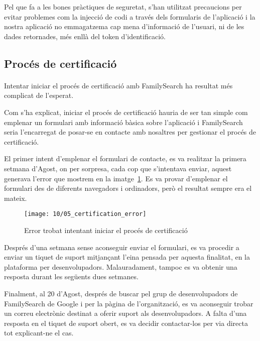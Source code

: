    Pel que fa a les bones pràctiques de seguretat, s'han utilitzat precaucions per evitar problemes com la injecció de codi a través dels formularis de l'aplicació i la nostra aplicació no emmagatzema cap mena d'informació de l'usuari, ni de les dades retornades, més enllà del token d'identificació.


    \subsection{Procés de certificació}

    \paragraph{}
    Intentar iniciar el procés de certificació amb FamilySearch ha resultat més complicat de l’esperat.

    Com s’ha explicat, iniciar el procés de certificació hauria de ser tan simple com emplenar un formulari amb informació bàsica sobre l’aplicació i FamilySearch seria l’encarregat de posar-se en contacte amb nosaltres per gestionar el procés de certificació.

    El primer intent d’emplenar el formulari de contacte, es va realitzar la primera setmana d’Agost, on per sorpresa, cada cop que s’intentava enviar, aquest generava l’error que mostrem en la imatge~\ref{fig:errorCErtification}. Es va provar d’emplenar el formulari des de diferents navegadors i ordinadors, però el resultat sempre era el mateix.

    \begin{figure}[h]
        \texttt{[image: 10/05\_certification\_error]}
        \centering
        \caption{Error trobat intentant iniciar el procés de certificació}\label{fig:errorCErtification}
    \end{figure}

    Després d’una setmana sense aconseguir enviar el formulari, es va procedir a enviar un tiquet de suport mitjançant l’eina pensada per aquesta finalitat, en la plataforma per desenvolupadors. Malauradament, tampoc es va obtenir una resposta durant les següents dues setmanes.

    Finalment, al 20 d’Agost, després de buscar pel grup de desenvolupadors de FamilySearch de Google i per la pàgina de l’organització, es va aconseguir trobar un correu electrònic destinat a oferir suport als desenvolupadors. A falta d’una resposta en el tiquet de suport obert, es va decidir contactar-los per via directa tot explicant-ne el cas.

